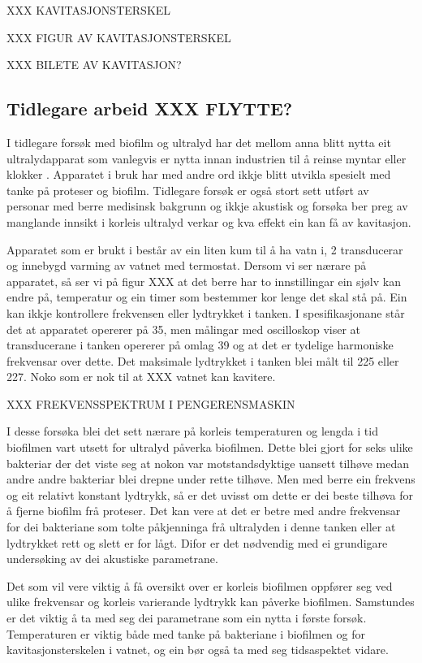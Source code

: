 XXX KAVITASJONSTERSKEL

XXX FIGUR AV KAVITASJONSTERSKEL

XXX BILETE AV KAVITASJON?

\subsection{Tidlegare arbeid XXX FLYTTE?}
I tidlegare forsøk med biofilm og ultralyd har det mellom anna blitt nytta eit ultralydapparat som vanlegvis er nytta innan industrien til å reinse myntar eller klokker \cite{sonorex}. Apparatet i bruk har med andre ord ikkje blitt utvikla spesielt med tanke på proteser og biofilm. Tidlegare forsøk er også stort sett utført av personar med berre medisinsk bakgrunn og ikkje akustisk og forsøka ber preg av manglande innsikt i korleis ultralyd verkar og kva effekt ein kan få av kavitasjon.

Apparatet som er brukt i \cite{ultraprotese} består av ein liten kum til å ha vatn i, 2 transducerar og innebygd varming av vatnet med termostat. Dersom vi ser nærare på apparatet, så ser vi på figur XXX at det berre har to innstillingar ein sjølv kan endre på, temperatur og ein timer som bestemmer kor lenge det skal stå på. Ein kan ikkje kontrollere frekvensen eller lydtrykket i tanken. I spesifikasjonane \cite{sonorex} står det at apparatet opererer på \unit{35}{\kilo\hertz}, men målingar med oscilloskop viser at transducerane i tanken opererer på omlag \unit{39}{\kilo\hertz} og at det er tydelige harmoniske frekvensar over dette. Det maksimale lydtrykket i tanken blei målt til \unit{225}{\kilo\pascal} eller \unit{227}{\deci\bel}. Noko som er nok til at XXX vatnet kan kavitere. 

XXX FREKVENSSPEKTRUM I PENGERENSMASKIN

I desse forsøka blei det sett nærare på korleis temperaturen og lengda i tid biofilmen vart utsett for ultralyd påverka biofilmen. Dette blei gjort for seks ulike bakteriar der det viste seg at nokon var motstandsdyktige uansett tilhøve medan andre andre bakteriar blei drepne under rette tilhøve. Men med berre ein frekvens og eit relativt konstant lydtrykk, så er det uvisst om dette er dei beste tilhøva for å fjerne biofilm frå proteser. Det kan vere at det er betre med andre frekvensar for dei bakteriane som tolte påkjenninga frå ultralyden i denne tanken eller at lydtrykket rett og slett er for lågt. Difor er det nødvendig med ei grundigare undersøking av dei akustiske parametrane.

Det som vil vere viktig å få oversikt over er korleis biofilmen oppfører seg ved ulike frekvensar og korleis varierande lydtrykk kan påverke biofilmen. Samstundes er det viktig å ta med seg dei parametrane som ein nytta i første forsøk. Temperaturen er viktig både med tanke på bakteriane i biofilmen og for kavitasjonsterskelen i vatnet, og ein bør også ta med seg tidsaspektet vidare.
